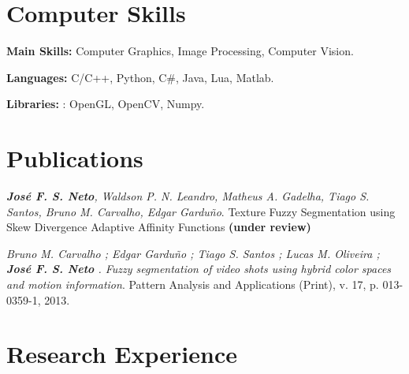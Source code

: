 \documentclass[letterpaper]{article}
\renewenvironment{itemize}{
  \begin{list}{}{
      \setlength{\leftmargin}{1.5em}
    }
  }{
  \end{list}
}
\begin{document}
\section*{Computer Skills}

\begin{itemize}
 \item \textbf{Main Skills:} Computer Graphics, Image Processing, Computer Vision.
  \item \textbf{Languages:} C/C++, Python, C\#, Java, Lua, Matlab.
  \item \textbf{Libraries:} : OpenGL, OpenCV, Numpy.

\end{itemize}

\section*{Publications}

\begin{itemize}

  \item \textit{\textbf{Jos\'e F. S. Neto}, Waldson P. N. Leandro, Matheus A. Gadelha, Tiago S. Santos, Bruno M. Carvalho, Edgar Gardu\~no}. Texture Fuzzy Segmentation using Skew Divergence Adaptive Affinity Functions \textbf{(under review)}

  \item \textit{Bruno M. Carvalho ; Edgar Gardu\~no ; Tiago S. Santos ; Lucas M. Oliveira ; \textbf{Jos\'e F. S. Neto} . Fuzzy segmentation of video shots using hybrid color spaces and motion
  information}. Pattern Analysis and Applications (Print), v. 17, p. 013-0359-1, 2013. \\

\end{itemize}

\section*{Research Experience}
\end{document}
